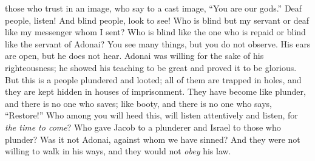 \begin{biblechapter}
those who trust in an image, 
who say to a cast image, “You are our gods.”
 Deaf people, listen! 
And blind people, look to see!
\verse Who is blind but my servant 
or deaf like my messenger whom I sent? 
Who is blind like the one who is repaid 
or blind like the servant of Adonai?
\verse You see many things, but you do not observe. 
His ears are open, but he does not hear.
\verse Adonai was willing for the sake of his righteousness; 
he showed his teaching to be great and proved it to be glorious.
\verse But this is a people plundered and looted; all of them are trapped in holes, 
and they are kept hidden in houses of imprisonment. 
They have become like plunder, and there is no one who saves; 
like booty, and there is no one who says, “Restore!”
\verse Who among you will heed this, 
will listen attentively and listen, for \textit{the time to come}?
\verse Who gave Jacob to a plunderer 
and Israel to those who plunder? Was it not Adonai, against whom we have sinned?
\verse And they were not willing to walk in his ways, 
and they would not \textit{obey} his law.
\end{biblechapter}

